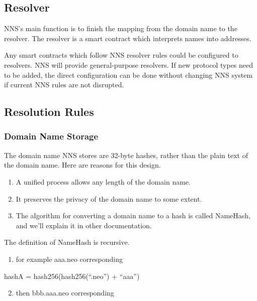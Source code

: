 \documentclass[letterpaper,10pt,english]{sphinxmanual}
\begin{document}
\subsection{Resolver}
\label{\detokenize{nns_system:resolver}}
NNS’s main function is to finish the mapping from the domain name to the resolver. The resolver is a smart contract which interprets names into addresses.

Any smart contracts which follow NNS resolver rules could be configured to resolvers. NNS will provide general-purpose resolvers.
If new protocol types need to be added, the direct configuration can be done without changing NNS system if current NNS rules are not disrupted.


\subsection{Resolution Rules}
\label{\detokenize{nns_system:resolution-rules}}

\subsubsection{Domain Name Storage}
\label{\detokenize{nns_system:domain-name-storage}}
The domain name NNS stores are 32-byte hashes, rather than the plain text of the domain name. Here are reasons for this design.
\begin{enumerate}
\item {} 
A unified process allows any length of the domain name.

\item {} 
It preserves the privacy of the domain name to some extent.

\item {} 
The algorithm for converting a domain name to a hash is called NameHash, and we’ll explain it in other documentation.

\end{enumerate}

The definition of NameHash is recursive.
\begin{enumerate}
\item {} 
for example aaa.neo corresponding

\end{enumerate}

%
\begin{sphinxVerbatim}[commandchars=\\\{\}]
hashA  =  hash256(hash256(“.neo”) + “aaa”)
\end{sphinxVerbatim}
\begin{enumerate}
\setcounter{enumi}{1}
\item {} 
then bbb.aaa.neo corresponding

\end{enumerate}
\end{document}
